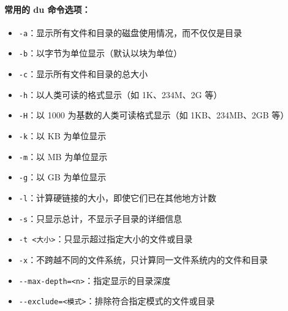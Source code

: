 \documentclass[12pt,UTF8]{ctexbook}
\begin{document}
\paragraph{常用的 du 命令选项：}
\begin{itemize}
    \item \verb+-a+：显示所有文件和目录的磁盘使用情况，而不仅仅是目录
    \item \verb+-b+：以字节为单位显示（默认以块为单位）
    \item \verb+-c+：显示所有文件和目录的总大小
    \item \verb+-h+：以人类可读的格式显示（如 1K、234M、2G 等）
    \item \verb+-H+：以 1000 为基数的人类可读格式显示（如 1KB、234MB、2GB 等）
    \item \verb+-k+：以 KB 为单位显示
    \item \verb+-m+：以 MB 为单位显示
    \item \verb+-g+：以 GB 为单位显示
    \item \verb+-l+：计算硬链接的大小，即使它们已在其他地方计数
    \item \verb+-s+：只显示总计，不显示子目录的详细信息
    \item \verb+-t <大小>+：只显示超过指定大小的文件或目录
    \item \verb+-x+：不跨越不同的文件系统，只计算同一文件系统内的文件和目录
    \item \verb+--max-depth=<n>+：指定显示的目录深度
    \item \verb+--exclude=<模式>+：排除符合指定模式的文件或目录
\end{itemize}
\end{document}
